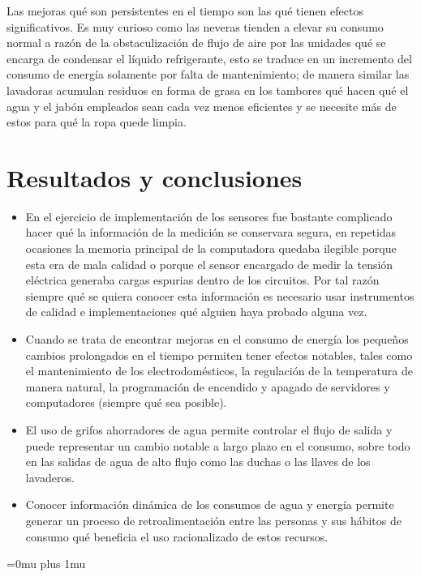 \documentclass[a4paper,man,natbib]{apa6}
\begin{document}
Las mejoras qué son persistentes en el tiempo son las qué tienen efectos significativos. Es muy curioso como las neveras tienden a elevar su consumo normal a razón de la obstaculización de flujo de aire por las unidades qué se encarga de condensar el líquido refrigerante, esto se traduce en un incremento del consumo de energía solamente por falta de mantenimiento; de manera similar las lavadoras acumulan residuos en forma de grasa en los tambores qué hacen qué el agua y el jabón empleados sean cada vez menos eficientes y se necesite más de estos para qué la ropa quede limpia.\newline


\section{Resultados y conclusiones}
\begin{itemize}
    \item En el ejercicio de implementación de los sensores fue bastante complicado hacer qué la información de la medición se conservara segura, en repetidas ocasiones la memoria principal de la computadora quedaba ilegible porque esta era de mala calidad o porque el sensor encargado de medir la tensión eléctrica generaba cargas espurias dentro de los circuitos. Por tal razón siempre qué se quiera conocer esta información es necesario usar instrumentos de calidad e implementaciones qué alguien haya probado alguna vez.

    \item Cuando se trata de encontrar mejoras en el consumo de energía los pequeños cambios prolongados en el tiempo permiten tener efectos notables, tales como el mantenimiento de los electrodomésticos, la regulación de la temperatura de manera natural, la programación de encendido y apagado de servidores y computadores (siempre qué sea posible).

    \item El uso de grifos ahorradores de agua permite controlar el flujo de salida y puede representar un cambio notable a largo plazo en el consumo, sobre todo en las salidas de agua de alto flujo como las duchas o las llaves de los lavaderos.

    \item Conocer información dinámica de los consumos de agua y energía permite generar un proceso de retroalimentación entre las personas y sus hábitos de consumo qué beneficia el uso racionalizado de estos recursos.
\end{itemize}

\nocite{*}

\Urlmuskip=0mu plus 1mu\relax


\end{document}
